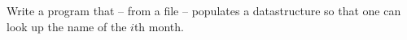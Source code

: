 Write a program that -- from a file -- populates a datastructure so that one can look up the name of the $i$th month.

